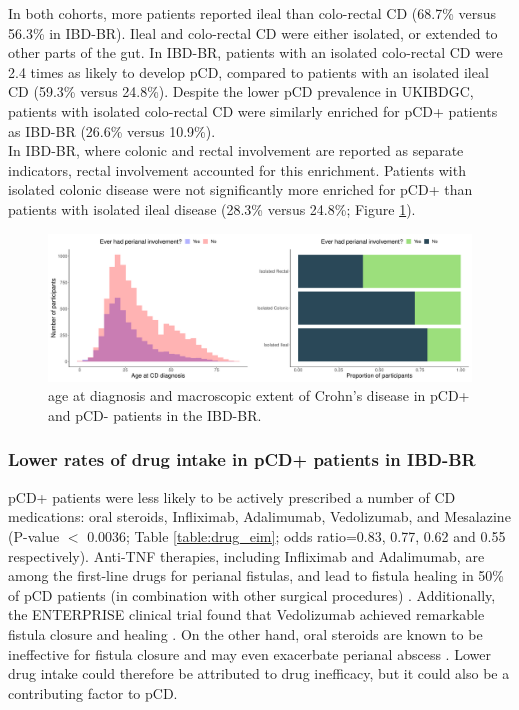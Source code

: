 In both cohorts, more patients reported ileal than colo-rectal CD (68.7\% versus 56.3\% in IBD-BR). Ileal and colo-rectal CD were either isolated, or extended to other parts of the gut. In IBD-BR, patients with an isolated colo-rectal CD were 2.4 times as likely to develop pCD, compared to patients with an isolated ileal CD (59.3\% versus 24.8\%).  Despite the lower pCD prevalence in UKIBDGC, patients with isolated colo-rectal CD were similarly enriched for pCD+ patients as IBD-BR (26.6\% versus 10.9\%). \\

In IBD-BR, where colonic and rectal involvement are reported as separate indicators, rectal involvement accounted for this enrichment. Patients with isolated colonic disease were not significantly more enriched for pCD+ than patients with isolated ileal disease (28.3\% versus 24.8\%; Figure \ref{fig:age_diag_macextent}).
\begin{figure}[htbp!] 
  \centering    
  \includegraphics[width=1.0\textwidth]{fig1}
  \caption[Figure]{age at diagnosis and macroscopic extent of Crohn's disease in pCD+ and pCD- patients in the IBD-BR.}
  \label{fig:age_diag_macextent}
  \end{figure}

\subsubsection{Lower rates of drug intake in pCD+ patients in IBD-BR}
pCD+ patients were less likely to be actively prescribed a number of CD medications: oral steroids, Infliximab, Adalimumab, Vedolizumab, and Mesalazine (P-value $<$ 0.0036; Table \ref{table:drug_eim}; odds ratio=0.83, 0.77, 0.62 and 0.55 respectively). Anti-TNF therapies, including Infliximab and Adalimumab, are among the first-line drugs for perianal fistulas, and lead to fistula healing in 50\% of pCD patients (in combination with other surgical procedures) \cite{Regueiro2003-lf,Kotze2014-fh,Haennig2015-pj,Gaertner2007-wb}. Additionally, the ENTERPRISE clinical trial found that Vedolizumab achieved remarkable fistula closure and healing \cite{Schwartz2022-zp}. On the other hand, oral steroids are known to be ineffective for fistula closure and may even exacerbate perianal abscess \cite{Jones1966-tt}. Lower drug intake could therefore be attributed to drug inefficacy, but it could also be a contributing factor to pCD.\\

